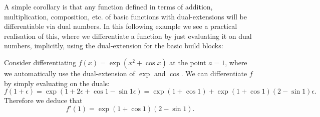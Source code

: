 A simple corollary is that any function defined in terms of addition, multiplication, composition, etc. of basic functions with dual-extensions will be differentiable via dual numbers. In this following example we see a practical realisation of this, where we differentiate a function by just evaluating it on dual numbers, implicitly, using the dual-extension for the basic build blocks:

\begin{example}

Consider differentiating $f(x) =  \exp(x^2 + \cos x)$ at the point $a = 1$, where  we automatically use the dual-extension of $\exp$ and $\cos$. We can differentiate $f$ by simply evaluating on the duals:
\[
f(1 + \ensuremath{\epsilon}) = \exp(1 + 2\ensuremath{\epsilon} + \cos 1 - \sin 1 \ensuremath{\epsilon}) =  \exp(1 + \cos 1) + \exp(1 + \cos 1) (2 - \sin 1) \ensuremath{\epsilon}.
\]
Therefore we deduce that
\[
f'(1) = \exp(1 + \cos 1) (2 - \sin 1).
\]
\end{example}



